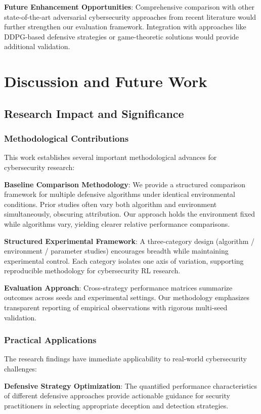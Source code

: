 \documentclass[12pt,oneside,a4paper]{article}
\theoremstyle{definition}
\theoremstyle{plain}
\begin{document}
\textbf{Future Enhancement Opportunities}: Comprehensive comparison with other state-of-the-art adversarial cybersecurity approaches from recent literature would further strengthen our evaluation framework. Integration with approaches like DDPG-based defensive strategies or game-theoretic solutions would provide additional validation.

\section{Discussion and Future Work}

\subsection{Research Impact and Significance}

\subsubsection{Methodological Contributions}
This work establishes several important methodological advances for cybersecurity research:

\textbf{Baseline Comparison Methodology}: We provide a structured comparison framework for multiple defensive algorithms under identical environmental conditions. Prior studies often vary both algorithm and environment simultaneously, obscuring attribution. Our approach holds the environment fixed while algorithms vary, yielding clearer relative performance comparisons.

\textbf{Structured Experimental Framework}: A three-category design (algorithm / environment / parameter studies) encourages breadth while maintaining experimental control. Each category isolates one axis of variation, supporting reproducible methodology for cybersecurity RL research.

\textbf{Evaluation Approach}: Cross-strategy performance matrices summarize outcomes across seeds and experimental settings. Our methodology emphasizes transparent reporting of empirical observations with rigorous multi-seed validation.

\subsubsection{Practical Applications}
The research findings have immediate applicability to real-world cybersecurity challenges:

\textbf{Defensive Strategy Optimization}: The quantified performance characteristics of different defensive approaches provide actionable guidance for security practitioners in selecting appropriate deception and detection strategies.
\end{document}
